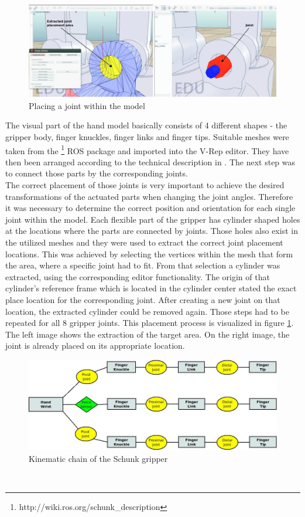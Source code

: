\begin{figure}[t]
	\centering
  	\includegraphics[width=1.0\textwidth]{images/place_joint.jpg}
	\caption{Placing a joint within the model}
	\label{fig:place_jnt}
\end{figure}

The visual part of the hand model basically consists of 4 different shapes - the gripper body, finger knuckles, finger links and finger tips. Suitable meshes were taken from the \footnote{http://wiki.ros.org/schunk\_description} ROS package and imported into the V-Rep editor. They have then been arranged according to the technical description in \citep{schunk2010}. The next step was to connect those parts by the corresponding joints. \\

The correct placement of those joints is very important to achieve the desired transformations of the actuated parts when changing the joint angles. Therefore it was necessary to determine the correct position and orientation for each single joint within the model. Each flexible part of the gripper has cylinder shaped holes at the locations where the parts are connected by joints. Those holes also exist in the utilized meshes and they were used to extract the correct joint placement locations. This was achieved by selecting the vertices within the mesh that form the area, where a specific joint had to fit. From that selection a cylinder was extracted, using the corresponding editor functionality. The origin of that cylinder's reference frame which is located in the cylinder center stated the exact place location for the corresponding joint. After creating a new joint on that location, the extracted cylinder could be removed again. Those steps had to be repeated for all 8 gripper joints. This placement process is visualized in figure \ref{fig:place_jnt}. The left image shows the extraction of the target area. On the right image, the joint is already placed on its appropriate location.
\begin{figure}[h]
	\centering
  	\includegraphics[width=1.0\textwidth]{images/hand_tree.jpg}
	\caption{Kinematic chain of the Schunk gripper}
	\label{fig:hand_tree}
\end{figure}\\

